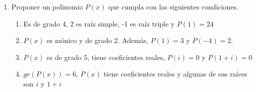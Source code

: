 \documentclass[a4paper]{article}
\newcommand{\exercise}{\item}
\newcommand{\df}[2]{\displaystyle\frac{#1}{#2}}
\begin{document}
\begin{enumerate}
\begin{multicols}{2}
	\begin{enumerate} [label=(\alph*)]
		\item $x^2+\sqrt{3}x-1$
		\item $8x^3-28x^2+14x+15$
		\item $x^5-1$
		\item $x^5+3x^4+3x^3+3x^2+2x$
		\item $x^4-\df{9}{2}x^3+21x-10$
		\item $x^7+18x^6+81x^5$
		\item $x^6-x^4-20x^2$
		\item $x^7-x$
		\item $x^4+2x^2-2$
		\item $x^6+3x^3-4$
	\end{enumerate}
	\end{multicols}
	\exercise Proponer un polinomio $P(x)$ que cumpla con las siguientes condiciones.
	\begin{multicols}{2}
	\begin{enumerate} [label=(\alph*)]
		\item Es de grado 4, 2 es raíz simple, -1 es raíz triple y $P(1)=24$
		\item $P(x)$ es mónico y de grado 2. Además, $P(1)=3$ y $P(-4)=2$.
		\item $P(x)$ es de grado 5, tiene coeficientes reales, $P(i)=0$ y $P(1+i)=0$
		\item $gr\left(P(x)\right)=6$, $P(x)$ tiene coeficientes reales y algunas de sus raíces son $i$ y $1+i$
	\end{enumerate}
	\end{multicols}
\end{enumerate}
\vspace{20pt} 
\end{document}
